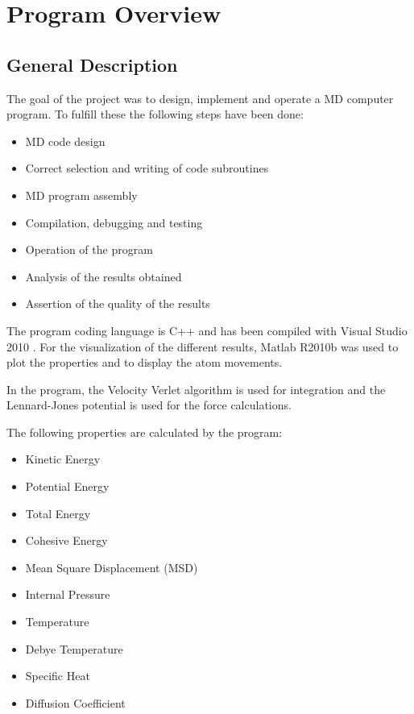 \section{Program Overview}

\subsection{General Description}

The goal of the project was to design, implement and operate a MD computer program. To fulfill these the following steps have been done:
\begin{itemize}
\item MD code design 
\item Correct selection and writing of code subroutines
\item MD program assembly
\item Compilation, debugging and testing
\item Operation of the program
\item Analysis of the results obtained
\item Assertion of the quality of the results
\end{itemize}

The program coding language is C++ and has been compiled with Visual Studio 2010 \textregistered. For the visualization of the different results, Matlab R2010b \textregistered was used to plot the properties and to display the atom movements.

In the program, the Velocity Verlet algorithm is used for integration and the Lennard-Jones potential is used for the force calculations.

The following properties are calculated by the program:

\begin{itemize}
\item Kinetic Energy
\item Potential Energy
\item Total Energy
\item Cohesive Energy
\item Mean Square Displacement (MSD)
\item Internal Pressure 
\item Temperature 
\item Debye Temperature 
\item Specific Heat 
\item Diffusion Coefficient
\end{itemize}

